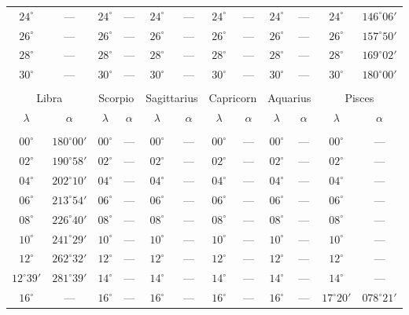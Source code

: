 \begin{table}[!h]
{\begin{tabular}{cc|cc|cc|cc|cc|cc}
$24^\circ$ & --- & $24^\circ$ & --- & $24^\circ$ & --- & $24^\circ$ & --- & $24^\circ$ & --- & $24^\circ$ & $146^\circ06'$\\
$26^\circ$ & --- & $26^\circ$ & --- & $26^\circ$ & --- & $26^\circ$ & --- & $26^\circ$ & --- & $26^\circ$ & $157^\circ50'$\\
$28^\circ$ & --- & $28^\circ$ & --- & $28^\circ$ & --- & $28^\circ$ & --- & $28^\circ$ & --- & $28^\circ$ & $169^\circ02'$\\
$30^\circ$ & --- & $30^\circ$ & --- & $30^\circ$ & --- & $30^\circ$ & --- & $30^\circ$ & --- & $30^\circ$ & $180^\circ00'$\\
\multicolumn{12}{c}{}\\
\multicolumn{2}{c}{Libra}\vline & \multicolumn{2}{c}{Scorpio} \vline& \multicolumn{2}{c}{Sagittarius} \vline& \multicolumn{2}{c}{Capricorn}\vline &
\multicolumn{2}{c}{Aquarius}\vline & \multicolumn{2}{c}{Pisces}\\\hline
$\lambda$& $\alpha$& $\lambda$& $\alpha$& $\lambda$& $\alpha$& $\lambda$& $\alpha$& $\lambda$& $\alpha$& $\lambda$& $\alpha$\\\hline
&&&&&&&&&&&\\[-2ex]
$00^\circ$ & $180^\circ00'$ & $00^\circ$ & --- & $00^\circ$ & --- & $00^\circ$ & --- &  $00^\circ$ & --- & $00^\circ$ & ---\\
$02^\circ$ & $190^\circ58'$ & $02^\circ$ & --- & $02^\circ$ & --- & $02^\circ$ & --- &  $02^\circ$ & --- & $02^\circ$ & ---\\
$04^\circ$ & $202^\circ10'$ & $04^\circ$ & --- & $04^\circ$ & --- & $04^\circ$ & --- &  $04^\circ$ & --- & $04^\circ$ & ---\\
$06^\circ$ & $213^\circ54'$ & $06^\circ$ & --- & $06^\circ$ & --- & $06^\circ$ & --- &  $06^\circ$ & --- & $06^\circ$ & ---\\
$08^\circ$ & $226^\circ40'$ & $08^\circ$ & --- & $08^\circ$ & --- & $08^\circ$ & --- &  $08^\circ$ & --- & $08^\circ$ & ---\\
$10^\circ$ & $241^\circ29'$ & $10^\circ$ & --- & $10^\circ$ & --- & $10^\circ$ & --- &  $10^\circ$ & --- & $10^\circ$ & ---\\
$12^\circ$ & $262^\circ32'$ & $12^\circ$ & --- & $12^\circ$ & --- & $12^\circ$ & --- &  $12^\circ$ & --- & $12^\circ$ & ---\\
$12^\circ39'$ & $281^\circ39'$ & $14^\circ$ & --- & $14^\circ$ & --- & $14^\circ$ & --- &  $14^\circ$ & --- & $14^\circ$ & ---\\
$16^\circ$ & --- & $16^\circ$ & --- & $16^\circ$ & --- & $16^\circ$ & --- &  $16^\circ$ & --- & $17^\circ20'$ &$078^\circ21'$\\

\end{tabular}}
\end{table}
